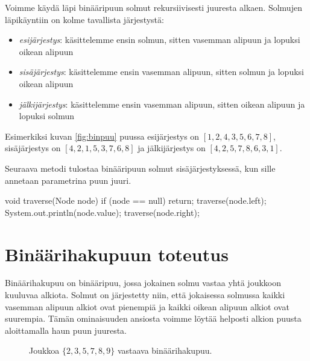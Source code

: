 Voimme käydä läpi binääripuun solmut rekursiivisesti
juuresta alkaen.
Solmujen läpikäyntiin on kolme tavallista järjestystä:

\begin{itemize}
\item \emph{esijärjestys}: käsittelemme ensin solmun, sitten vasemman alipuun
ja lopuksi oikean alipuun
\item \emph{sisäjärjestys}: käsittelemme ensin vasemman alipuun, sitten solmun
ja lopuksi oikean alipuun
\item \emph{jälkijärjestys}: käsittelemme ensin vasemman alipuun,
sitten oikean alipuun ja lopuksi solmun
\end{itemize}

Esimerkiksi kuvan \ref{fig:binpuu} puussa
esijärjestys on $[1,2,4,3,5,6,7,8]$,
sisäjärjes\-tys on $[4,2,1,5,3,7,6,8]$ ja
jälkijärjestys on $[4,2,5,7,8,6,3,1]$.

Seuraava metodi tulostaa binääripuun solmut
sisäjärjestyksessä, kun sille annetaan parametrina
puun juuri.

\begin{code}
void traverse(Node node) {
    if (node == null) return;
    traverse(node.left);
    System.out.println(node.value);
    traverse(node.right);
}
\end{code}

\section{Binäärihakupuun toteutus}

Binäärihakupuu on binääripuu, jossa jokainen solmu vastaa
yhtä joukkoon kuuluvaa alkiota.
Solmut on järjestetty niin, että jokaisessa solmussa
kaikki vasemman alipuun alkiot ovat pienempiä
ja kaikki oikean alipuun alkiot ovat suurempia.
Tämän ominaisuuden ansiosta voimme löytää helposti
alkion puusta aloittamalla haun puun juuresta.

\begin{figure}
\center
{}
\caption{Joukkoa $\{2,3,5,7,8,9\}$ vastaava binäärihakupuu.}
\label{fig:bihpuu}
\end{figure}

